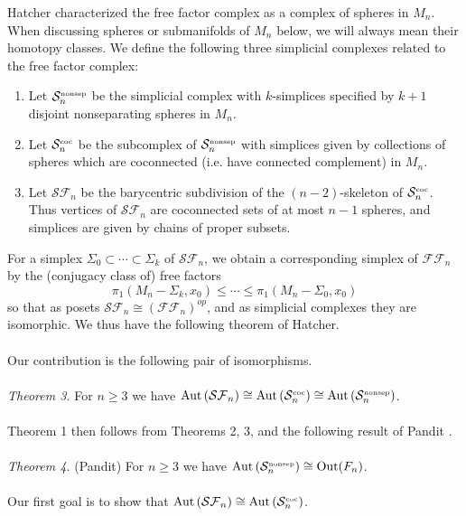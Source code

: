 \documentclass[11pt]{article}
\newcommand{\Aut}[1]{\ensuremath{ \aaut \left (#1 \right ) }}
\newcommand{\outn}{{\ensuremath{ \oout(F_n)}} }
\newcommand{\nosep}{{\ensuremath{ \mathcal S^{\mbox{\tiny{nonsep}}}_n }}}
\newcommand{\coc}[1]{{\ensuremath{ \mathcal S^{\mbox{\tiny{coc}}}_{#1} }}}
\newcommand{\ffn}{{\ensuremath{ \mathcal {FF}_n }}}
\newcommand{\sfn}{{\ensuremath{ \mathcal {SF}_n }}}
\DeclareMathOperator{\oout}{Out}
\DeclareMathOperator{\aaut}{Aut}
\theoremstyle{remark}
\theoremstyle{definition}
\begin{document}
Hatcher \cite{MR1660045} characterized the free factor complex as a complex of spheres in $M_n$.
When discussing spheres or submanifolds of $M_n$ below, we will always mean their homotopy classes.
We define the following three simplicial complexes related to the free factor complex:
\begin{enumerate}[$\cdot$]
\item
Let $\nosep$ be the simplicial complex with $k$-simplices specified by $k+1$ disjoint nonseparating spheres in $M_n$.
\item
Let $\coc n$ be the subcomplex of $\nosep$ with simplices given by collections of spheres which are coconnected (i.e. have connected complement) in $M_n$.
\item
Let $\sfn$ be the barycentric subdivision of the $(n-2)$-skeleton of $\coc n$. Thus vertices of $\sfn$ are coconnected sets of at most $n-1$ spheres, and simplices are given by chains of proper subsets.
\end{enumerate}
For a simplex $\Sigma_0 \subset \cdots \subset \Sigma_k$ of $\sfn$, we obtain a corresponding
simplex of $\ffn$ by the (conjugacy class of) free factors $$\pi_1(M_n-\Sigma_k,x_0) \leqslant \cdots \leqslant \pi_1(M_n-\Sigma_0,x_0)$$ so that as posets $\sfn \cong (\ffn)^{op}$, and as simplicial complexes they are isomorphic. We thus have the following theorem of Hatcher.\\
\\
Our contribution is the following pair of isomorphisms.\\
\\
\noindent \emph{Theorem 3.} For $n \geq 3$ we have
$\Aut{\sfn} \cong \Aut{\coc n} \cong \Aut{\nosep}$.\\
\\
Theorem 1 then follows from Theorems 2, 3, and the following result of Pandit \cite{pandit}.\\
\\
\emph{Theorem 4.} (Pandit) For $n \geq 3$ we have $\Aut{\nosep} \cong \outn$.\\
\\
Our first goal is to show that $\Aut{\sfn} \cong \Aut{\coc n}$.
\end{document}
